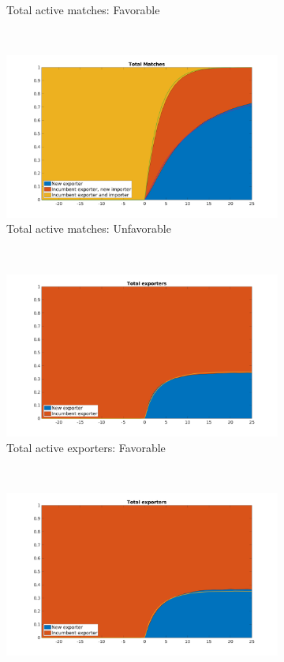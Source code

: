 \documentclass[12pt]{article}
\begin{document}
\begin{figure}[tbp]
\begin{subfigure}[b]{0.45\textwidth}
        \caption{Total active matches: Favorable}
    \end{subfigure} ~ 
\begin{subfigure}[b]{0.45\textwidth}
        \centering
        \includegraphics[width=\textwidth]{figures/total_matches_pct_unf}
        \caption{Total active matches: Unfavorable}
    \end{subfigure} \newline
~ 
\begin{subfigure}[b]{0.45\textwidth}
        \centering
        \includegraphics[width=\textwidth]{figures/total_firms_pct}
        \caption{Total active exporters: Favorable}
    \end{subfigure} ~ 
\begin{subfigure}[b]{0.45\textwidth}
        \centering
        \includegraphics[width=\textwidth]{figures/total_firms_pct_unf}

\end{subfigure}
\end{figure}
\end{document}
